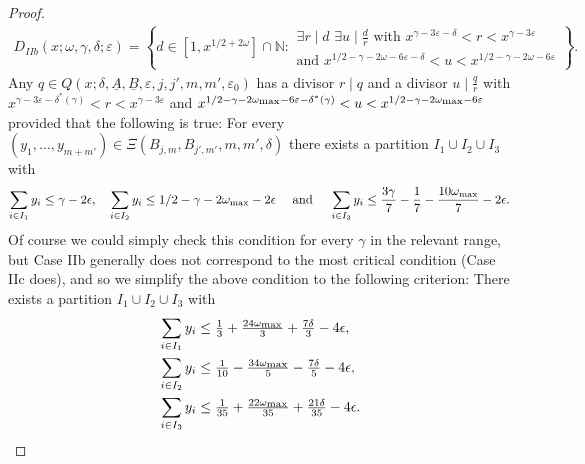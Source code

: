 \documentclass{amsart}
\numberwithin{equation}{section}
\begin{document}
\begin{proof}
\begin{align*}
D_{IIb}(x;\omega,\gamma,\delta;\varepsilon) = \left\{d \in  [1, x^{1/2+2\omega}]\cap \mathbb{N}:  \begin{array}{l} 
\exists r \mid d \,\, \exists u \mid \frac{d}{r}  \mbox{ with } x^{\gamma -3\varepsilon-\delta} < r < x^{\gamma - 3\varepsilon} \\ \mbox{and } x^{1/2 -\gamma-2\omega -6 \varepsilon-\delta } < u < x^{1/2-\gamma-2\omega  -6\varepsilon}
\end{array}\right\}.
\end{align*}
Any $q \in Q(x;\delta,\underline{A},\underline{B},\varepsilon,j,j',m,m',\varepsilon_0)$ has a divisor $r \mid q$  and a divisor $u \mid \frac{q}{r}$ with  $   x^{\gamma -3\varepsilon-\delta^*(\gamma)} < r < x^{\gamma - 3\varepsilon}$ and $x^{1/2 -\gamma-2\omega_{\begin{scriptsize}
\mbox{max}\end{scriptsize}} -6 \varepsilon-\delta^*(\gamma) } < u < x^{1/2-\gamma-2\omega_{\begin{scriptsize}
\mbox{max}\end{scriptsize}} -6\varepsilon}$
provided that the following is true: For  every  $(y_1, \dots, y_{m+m'}) \in \Xi(B_{j,m},B_{j',m'},m,m',\delta)$  there exists a partition $I_1 \cup I_2 \cup I_3$ with  
\begin{align*}
 \sum_{i \in I_1} y_i \leq \gamma-2\epsilon, \quad  \sum_{i \in I_2} y_i \leq  1/2 -\gamma-2\omega_{\begin{scriptsize}
\mbox{max}\end{scriptsize}} -2 \epsilon 
\quad \mbox{ and } \quad  \sum_{i \in I_3} y_i \leq         \frac{3\gamma}{7}-\frac{1}{7}  -\frac{10\omega_{\begin{scriptsize}
\mbox{max}\end{scriptsize}}}{7}  - 2\epsilon .
\end{align*}
 Of course we could simply check this condition for every $\gamma$ in the relevant range, but Case IIb generally does not correspond to the most critical condition (Case IIc  does), and so we  simplify the above condition to the following criterion: There exists a partition $I_1 \cup I_2 \cup I_3$ with  
 \begin{align}
 &\sum_{i \in I_1} y_i \leq  \tfrac{1}{3}+\tfrac{24\omega_{\begin{scriptsize}
\mbox{max}\end{scriptsize}}}{3} +\tfrac{7\delta}{3}   -4\epsilon, \\  &\sum_{i \in I_2} y_i \leq    
  \tfrac{1}{10}-\tfrac{34\omega_{\begin{scriptsize}
\mbox{max}\end{scriptsize}}}{5} -\tfrac{7\delta}{5}    
 -4 \epsilon,  \nonumber  \\
&\sum_{i \in I_3} y_i \leq            \tfrac{1}{35}+\tfrac{22\omega_{\begin{scriptsize}
\mbox{max}\end{scriptsize}}}{35} +\tfrac{21\delta}{35}     - 4\epsilon . \nonumber
\end{align}



\end{proof}
\end{document}
